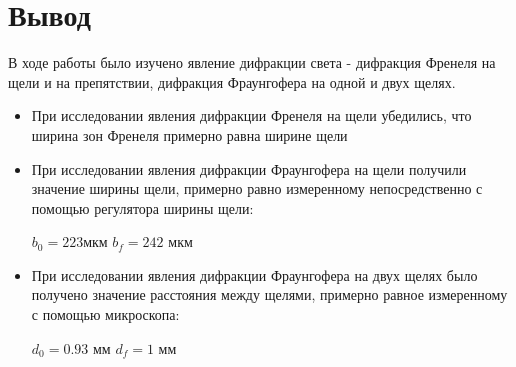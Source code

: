 \documentclass[a4paper]{article}
\begin{document}
\section*{Вывод}

В ходе работы было изучено явление дифракции света - дифракция Френеля на щели и на препятствии, дифракция Фраунгофера на одной и двух щелях.

\begin{itemize}
    \item При исследовании явления дифракции Френеля на щели убедились, что ширина зон Френеля примерно равна ширине щели
    
    \item При исследовании явления дифракции Фраунгофера на щели получили значение ширины щели, примерно равно измеренному непосредственно с помощью регулятора ширины щели:
    \begin{center}
        $b_0 = 223 $мкм \hspace{1cm} $b_f = 242$ мкм
    \end{center}
    
    \item При исследовании явления дифракции Фраунгофера на двух щелях было получено значение расстояния между щелями, примерно равное измеренному с помощью микроскопа:
    
    \begin{center}
        $d_0 = 0.93$ мм \hspace{1cm} $d_f = 1$ мм
    \end{center}
\end{itemize}
\end{document}
